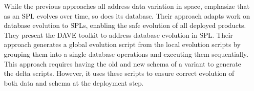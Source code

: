 While the previous approaches all address data variation in space,
\citet{dbSPLevolve} emphasize that as an SPL evolves over time, so does its
database. Their approach adapts work on database evolution to SPLs, enabling
the safe evolution of all deployed products.
%
 They present the DAVE toolkit to address database evolution in SPL. Their
 approach generates a global evolution script from the local evolution scripts
 by grouping them into a single database operations and executing them
 sequentially. This approach requires having the old and new schema of a
 variant to generate the delta scripts. However, it uses these scripts to
 ensure correct evolution of both data and schema at the deployment step. 

 

